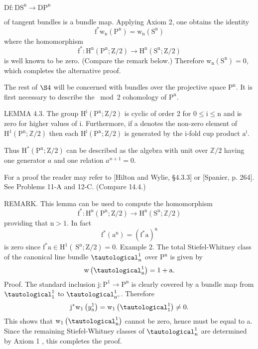 \documentclass[10pt]{article}
\begin{document}
$\mathrm{Df}: \mathrm{DS}^{\mathrm{n}} \rightarrow \mathrm{DP}^{\mathrm{n}}$

of tangent bundles is a bundle map. Applying Axiom 2, one obtains the identity
$$
\mathrm{f}^{*} \mathrm{w}_{\mathrm{n}}\left(\mathrm{P}^{\mathrm{n}}\right)=\mathrm{w}_{\mathrm{n}}\left(\mathrm{S}^{\mathrm{n}}\right)
$$
where the homomorphism
$$
\mathrm{f}^{*}: \mathrm{H}^{\mathrm{n}}\left(\mathrm{P}^{\mathrm{n}} ; \mathrm{Z} / 2\right) \rightarrow \mathrm{H}^{\mathrm{n}}\left(\mathrm{S}^{\mathrm{n}} ; \mathrm{Z} / 2\right)
$$
is well known to be zero. (Compare the remark below.) Therefore $\mathrm{w}_{\mathrm{n}}\left(\mathrm{S}^{\mathrm{n}}\right)=0$, which completes the alternative proof.

The rest of $\S 4$ will be concerned with bundles over the projective space $\mathrm{P}^{\mathrm{n}}$. It is first necessary to describe the $\bmod 2$ cohomology of $\mathrm{P}^{\mathrm{n}}$.

LEMMA 4.3. The group $\mathrm{H}^{\mathrm{i}}\left(\mathrm{P}^{\mathrm{n}} ; \mathrm{Z} / 2\right)$ is cyclic of order 2 for $0 \leq \mathrm{i} \leq \mathrm{n}$ and is zero for higher values of i. Furthermore, if a denotes the non-zero element of $\mathrm{H}^{1}\left(\mathrm{P}^{\mathrm{n}} ; \mathbb{Z} / 2\right)$ then each $\mathrm{H}^{\mathrm{i}}\left(\mathrm{P}^{\mathrm{n}} ; \mathrm{Z} / 2\right)$ is generated by the $\mathrm{i}$-fold cup product $\mathrm{a}^{\mathrm{i}}$.

Thus $\mathrm{H}^{*}\left(\mathrm{P}^{\mathrm{n}} ; \mathrm{Z} / 2\right)$ can be described as the algebra with unit over $\mathbb{Z} / 2$ having one generator $a$ and one relation $a^{n+1}=0$.

For a proof the reader may refer to [Hilton and Wylie, §4.3.3] or [Spanier, p. 264]. See Problems 11-A and 12-C. (Compare 14.4.)

REMARK. This lemma can be used to compute the homomorphism
$$
\mathrm{f}^{*}: \mathrm{H}^{\mathrm{n}}\left(\mathrm{P}^{\mathrm{n}} ; \mathrm{Z} / 2\right) \rightarrow \mathrm{H}^{\mathrm{n}}\left(\mathrm{S}^{\mathrm{n}} ; \mathbb{Z} / 2\right)
$$
providing that $\mathrm{n}>1$. In fact
$$
\mathrm{f}^{*}\left(\mathrm{a}^{\mathrm{n}}\right)=\left(\mathrm{f}^{*} \mathrm{a}\right)^{\mathrm{n}}
$$
is zero since $\mathrm{f}^{*} \mathrm{a} \in \mathrm{H}^{1}\left(\mathrm{~S}^{\mathrm{n}} ; \mathrm{Z} / 2\right)=0$. Example 2. The total Stiefel-Whitney class of the canonical line bundle $\tautological_{n}^{1}$ over $\mathrm{P}^{\mathrm{n}}$ is given by
$$
\mathrm{w}\left(\tautological_{\mathrm{n}}^{1}\right)=1+\mathrm{a} .
$$
Proof. The standard inclusion $\mathrm{j}: \mathrm{P}^{1} \rightarrow \mathrm{P}^{\mathrm{n}}$ is clearly covered by a bundle map from $\tautological_{1}^{1}$ to $\tautological_{\mathrm{n}^{\circ}}^{1}$. Therefore
$$
\mathrm{j}^{*} \mathrm{w}_{1}\left(y_{\mathrm{n}}^{1}\right)=\mathrm{w}_{1}\left(\tautological_{1}^{1}\right) \neq 0 .
$$
This shows that $\mathrm{w}_{1}\left(\tautological_{\mathrm{n}}^{1}\right)$ cannot be zero, hence must be equal to a. Since the remaining Stiefel-Whitney classes of $\tautological_{n}^{1}$ are determined by Axiom 1 , this completes the proof.
\end{document}
